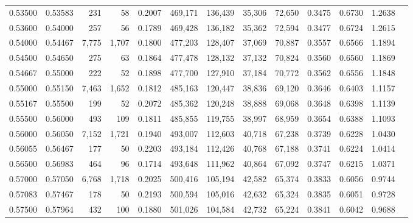 \begin{tabular}{rrrrrrrrrrrrr}
0.53500 & 0.53583 &    231 &    58 &                                     0.2007 & 469,171 & 136,439 &  35,306 &  72,650 & 0.3475 & 0.6730 & 1.2638 \\
0.53600 & 0.54000 &    257 &    56 &                                     0.1789 & 469,428 & 136,182 &  35,362 &  72,594 & 0.3477 & 0.6724 & 1.2615 \\
0.54000 & 0.54467 &  7,775 & 1,707 &                                     0.1800 & 477,203 & 128,407 &  37,069 &  70,887 & 0.3557 & 0.6566 & 1.1894 \\
0.54500 & 0.54650 &    275 &    63 &                                     0.1864 & 477,478 & 128,132 &  37,132 &  70,824 & 0.3560 & 0.6560 & 1.1869 \\
0.54667 & 0.55000 &    222 &    52 &                                     0.1898 & 477,700 & 127,910 &  37,184 &  70,772 & 0.3562 & 0.6556 & 1.1848 \\
0.55000 & 0.55150 &  7,463 & 1,652 &                                     0.1812 & 485,163 & 120,447 &  38,836 &  69,120 & 0.3646 & 0.6403 & 1.1157 \\
0.55167 & 0.55500 &    199 &    52 &                                     0.2072 & 485,362 & 120,248 &  38,888 &  69,068 & 0.3648 & 0.6398 & 1.1139 \\
0.55500 & 0.56000 &    493 &   109 &                                     0.1811 & 485,855 & 119,755 &  38,997 &  68,959 & 0.3654 & 0.6388 & 1.1093 \\
0.56000 & 0.56050 &  7,152 & 1,721 &                                     0.1940 & 493,007 & 112,603 &  40,718 &  67,238 & 0.3739 & 0.6228 & 1.0430 \\
0.56055 & 0.56467 &    177 &    50 &                                     0.2203 & 493,184 & 112,426 &  40,768 &  67,188 & 0.3741 & 0.6224 & 1.0414 \\
0.56500 & 0.56983 &    464 &    96 &                                     0.1714 & 493,648 & 111,962 &  40,864 &  67,092 & 0.3747 & 0.6215 & 1.0371 \\
0.57000 & 0.57050 &  6,768 & 1,718 &                                     0.2025 & 500,416 & 105,194 &  42,582 &  65,374 & 0.3833 & 0.6056 & 0.9744 \\
0.57083 & 0.57467 &    178 &    50 &                                     0.2193 & 500,594 & 105,016 &  42,632 &  65,324 & 0.3835 & 0.6051 & 0.9728 \\
0.57500 & 0.57964 &    432 &   100 &                                     0.1880 & 501,026 & 104,584 &  42,732 &  65,224 & 0.3841 & 0.6042 & 0.9688 \\

\end{tabular}
